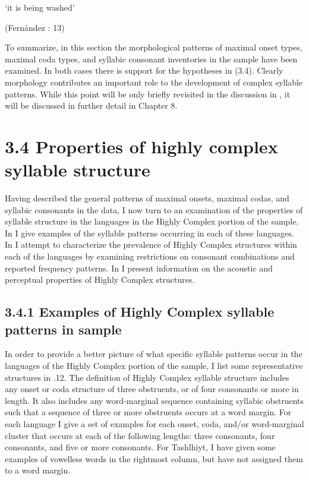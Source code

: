 ‘it is being washed’

(Fernández \citealt{GarayHernández2006}: 13)
\z

  To summarize, in this section the morphological patterns of maximal onset types, maximal coda types, and syllabic consonant inventories in the sample have been examined. In both cases there is support for the hypotheses in (3.4). Clearly morphology contributes an important role to the development of complex syllable patterns. While this point will be only briefly revisited in the discussion in , it will be discussed in further detail in Chapter 8.

\section{3.4 Properties of highly complex syllable structure}

  Having described the general patterns of maximal onsets, maximal codas, and syllabic consonants in the data, I now turn to an examination of the properties of syllable structure in the languages in the Highly Complex portion of the sample. In  I give examples of the syllable patterns occurring in each of these languages. In  I attempt to characterize the prevalence of Highly Complex structures within each of the languages by examining restrictions on consonant combinations and reported frequency patterns. In  I present information on the acoustic and perceptual properties of Highly Complex structures.

\subsection{3.4.1 Examples of Highly Complex syllable patterns in sample}

  In order to provide a better picture of what specific syllable patterns occur in the languages of the Highly Complex portion of the sample, I list some representative structures in .12. The definition of Highly Complex syllable structure includes any onset or coda structure of three obstruents, or of four consonants or more in length. It also includes any word-marginal sequence containing syllabic obstruents such that a sequence of three or more obstruents occurs at a word margin. For each language I give a set of examples for each onset, coda, and/or word-marginal cluster that occurs at each of the following lengths: three consonants, four consonants, and five or more consonants. For Tashlhiyt, I have given some examples of vowelless words in the rightmost column, but have not assigned them to a word margin.

